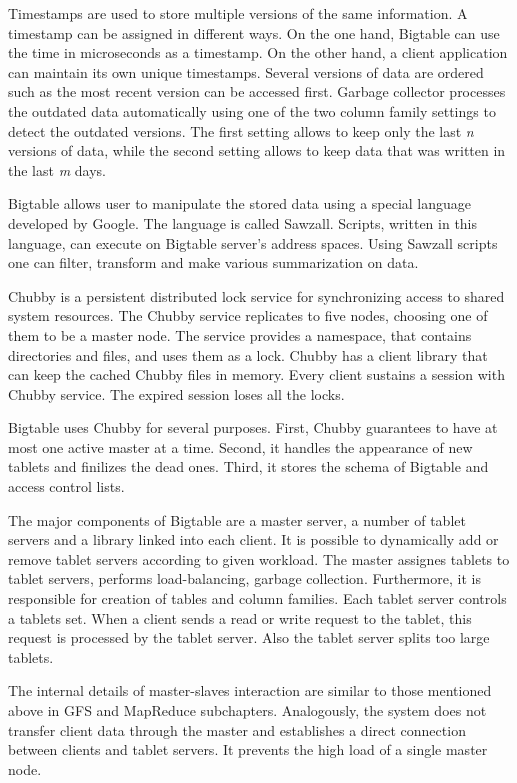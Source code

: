 Timestamps are used to store multiple versions of the same information.
A timestamp can be assigned in different ways.
On the one hand, Bigtable can use the time in microseconds as a timestamp.  
On the other hand, a client application can maintain its own unique timestamps.
Several versions of data are ordered such as the most recent version can be accessed first. 
Garbage collector processes the outdated data automatically using one of the two column family settings to detect the outdated versions.
The first setting allows to keep only the last \textit{n} versions of data, while the second setting allows to keep data that was written in the last \textit{m} days.

Bigtable allows user to manipulate the stored data using a special language developed by Google.
The language is called Sawzall.
Scripts, written in this language, can execute on Bigtable server's address spaces.
Using Sawzall scripts one can filter, transform and make various summarization on data.

Chubby is a persistent distributed lock service for synchronizing access to shared system resources.
The Chubby service replicates to five nodes, choosing one of them to be a master node.
The service provides a namespace, that contains directories and files, and uses them as a lock.
Chubby has a client library that can keep the cached Chubby files in memory.
Every client sustains a session with Chubby service.
The expired session loses all the locks.

Bigtable uses Chubby for several purposes.
First, Chubby guarantees to have at most one active master at a time.
Second, it handles the appearance of new tablets and finilizes the dead ones.
Third, it stores the schema of Bigtable and access control lists.

The major components of Bigtable are a master server, a number of tablet servers and a library linked into each client.
It is possible to dynamically add or remove tablet servers according to given workload.
The master assignes tablets to tablet servers, performs load-balancing, garbage collection.
Furthermore, it is responsible for creation of tables and column families.
Each tablet server controls a tablets set.
When a client sends a read or write request to the tablet, this request is processed by the tablet server.
Also the tablet server splits too large tablets.

The internal details of master-slaves interaction are similar to those mentioned above in GFS and MapReduce subchapters.
Analogously, the system does not transfer client data through the master and establishes a direct connection between clients and tablet servers.
It prevents the high load of a single master node.

